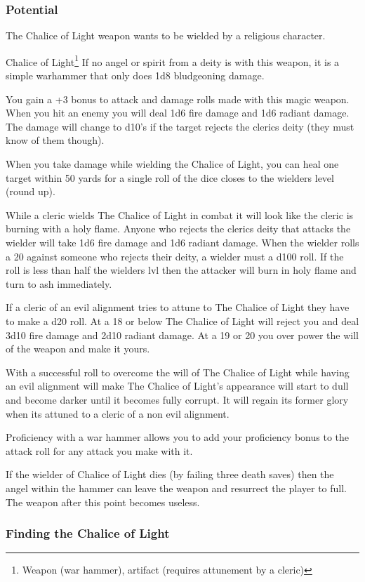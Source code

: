 \subsubsection{Potential}

The Chalice of Light weapon wants to be wielded by a religious character. 

\begin{commentbox}{Chalice of Light\footnote{Weapon (war hammer), artifact (requires attunement by a cleric)}}	
	If no angel or spirit from a deity is with this weapon, it is a simple warhammer that only does 1d8 bludgeoning damage.
	
	You gain a +3 bonus to attack and damage rolls made with this magic weapon. When you hit an enemy you will deal 1d6 fire damage and 1d6 radiant damage. The damage will change to d10's if the target rejects the clerics deity (they must know of them though).
	
	When you take damage while wielding the Chalice of Light, you can heal one target within 50 yards for a single roll of the dice closes to the wielders level (round up).
	
	While a cleric wields The Chalice of Light in combat it will look like the cleric is burning with a holy flame. Anyone who rejects the clerics deity that attacks the wielder will take 1d6 fire damage and 1d6 radiant damage. When the wielder rolls a 20 against someone who rejects their deity, a wielder must a d100 roll. If the roll is less than half the wielders lvl then the attacker will burn in holy flame and turn to ash immediately.
	
	If a cleric of an evil alignment tries to attune to The Chalice of Light they have to make a d20 roll. At a 18 or below The Chalice of Light will reject you and deal 3d10 fire damage and 2d10 radiant damage. At a 19 or 20 you over power the will of the weapon and make it yours.
	
	With a successful roll to overcome the will of The Chalice of Light while having an evil alignment will make The Chalice of Light's appearance will start to dull and become darker until it becomes fully corrupt. It will regain its former glory when its attuned to a cleric of a non evil alignment.
	
	Proficiency with a war hammer allows you to add your proficiency bonus to the attack roll for any attack you make with it.
	
	If the wielder of Chalice of Light dies (by failing three death saves) then the angel within the hammer can leave the weapon and resurrect the player to full. The weapon after this point becomes useless.
\end{commentbox}


\subsubsection{Finding the Chalice of Light}

